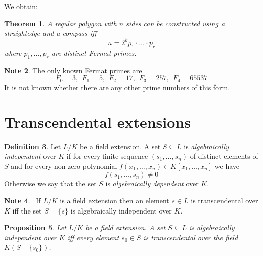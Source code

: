 \documentclass[12pt, letterpaper, oneside]{article}
\theoremstyle{plain}
\newtheorem{theorem}{Theorem}[section]
\newtheorem{proposition}[theorem]{Proposition}
\theoremstyle{definition}
\newtheorem{definition}[theorem]{Definition}
\newtheorem{note}[theorem]{Note}
\newcommand{\vs}{\vskip 5mm}
\begin{document}
\vs\vs

We obtain:

\begin{theorem}
A regular polygon with $n$ sides can be constructed using a straightedge and a compass iff 
$$n = 2^{k}p_{1}\cdot{\dots}\cdot p_{r}$$
where $p_{1}, \dots, p_{r}$ are distinct Fermat primes. 
\end{theorem}


\vs\vs

\begin{note}
The only known Fermat primes are 
$$F_{0} =3, \ \ F_{1} =  5, \ \ F_{2} = 17, \ \ F_{3} = 257, \ \  F_{4} = 65537$$
It is not known whether  there are any other prime numbers  of this form.
\end{note} 











\newpage
\section{Transcendental extensions}
\label{SEC_TRANSCEXT}



\begin{definition}
Let $L/K$ be a field extension. A set $S\subseteq L$ is \emph{algebraically independent}
over $K$ if for every finite sequence $(s_{1}, \dots, s_{n})$ of distinct elements of $S$
and for every non-zero polynomial $f(x_{1}, \dots, x_{n})\in K[x_{1}, \dots, x_{n}]$ we have 
$$f(s_{1}, \dots, s_{n}) \neq 0$$
Otherwise we say that the set $S$ is \emph{algebraically dependent} over $K$.  
\end{definition}

\vs\vs

\begin{note}\ 
 If $L/K$ is a field extension then an element $s\in L$ is transcendental over $K$ iff 
the set $S = \{s\}$ is algebraically independent over $K$. 
\end{note}


\vs\vs


\begin{proposition}
\label{PROP_TRANSCVSALGIND}
Let $L/K$ be a field extension. A set $S\subseteq L$ is algebraically independent over $K$ 
iff every  element $s_{0}\in S$ is transcendental over the field $K(S-\{s_{0}\})$.  
\end{proposition}
\end{document}
